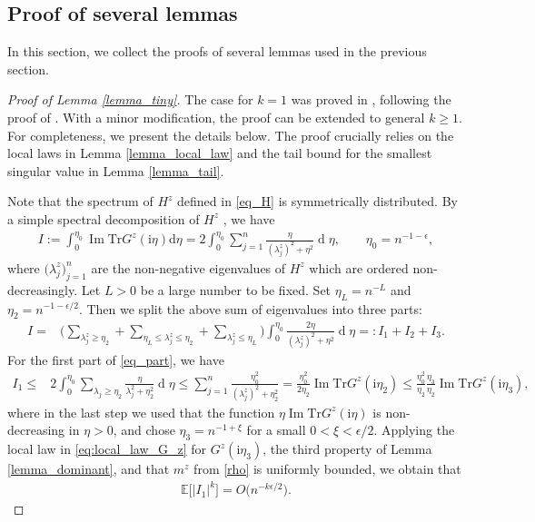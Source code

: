 \documentclass[10pt,reqno]{amsart}
\numberwithin{equation}{section}
\numberwithin{figure}{section}
\theoremstyle{plain}
\newcommand{\ii}{\mathrm{i}}
\newcommand{\<}{\langle}
\renewcommand{\>}{\rangle}
\newcommand{\dd}{\operatorname{d}\!{}}
\renewcommand{\Im}{\operatorname{Im}}
\begin{document}
\subsection{Proof of several lemmas}

In this section, we collect the proofs of several lemmas used in the previous section. 

\begin{proof}[Proof of Lemma \ref{lemma_tiny}]
	The case for $k=1$ was proved in \cite[Lemma 4.2]{chafai-garcia-zelada-xu}, following the proof of \cite[Lemma 4]{zbMATH07329432}. With a minor modification, the proof can be extended to general $k\geq 1$. For completeness, we present the details below. The proof crucially relies on the local laws in Lemma \ref{lemma_local_law} and the tail bound for the smallest singular value in Lemma \ref{lemma_tail}.  
	
	
	Note that the spectrum of $H^{z}$ defined in \eqref{eq_H} is symmetrically distributed. By a simple spectral decomposition of $H^{z}$ , we have
	\begin{align}
		I:=\int_{0}^{\eta_0}\Im \mathrm{Tr} G^z (\ii \eta) \mathrm{d} \eta=2  \int_{0}^{\eta_0} \sum_{j=1}^{n} \frac{\eta}{(\lambda_j^z)^2+\eta^2} \dd \eta, \qquad \eta_0=n^{-1-\epsilon},
	\end{align}
	where $\big(\lambda^{z}_{j}\big)_{j=1}^n$ are the non-negative eigenvalues of $H^z$ which are ordered non-decreasingly.
	Let $L>0$ be a large number to be fixed.  Set $\eta_L=n^{-L}$ and $\eta_2=n^{-1-\epsilon/2}$. Then we split the above sum of eigenvalues into three parts:
	\begin{align}\label{eq_part}
		I=& \Big(\sum_{\lambda^z_j \geq \eta_2}+\sum_{\eta_L\leq \lambda^z_j \leq \eta_2} +\sum_{\lambda^z_j\leq \eta_L}\Big)  \int_{0}^{\eta_0}  \frac{2\eta}{(\lambda_j^z)^2+\eta^2} \dd \eta=:I_1+I_2+I_3.
	\end{align}
	For the first part of \eqref{eq_part}, we have
	\begin{align}
		I_1\leq & 2 \int_{0}^{\eta_0} \sum_{\lambda_j\geq \eta_2} \frac{\eta}{\lambda_j^2+\eta_2^2} \dd \eta \leq   \sum_{j=1}^{n} \frac{\eta_0^2}{(\lambda^z_j)^2+\eta_2^2}   = \frac{\eta_0^2}{2\eta_2} \Im\mathrm{Tr}G^{z}(\ii \eta_2)\leq \frac{\eta_0^2}{\eta_2} \frac{\eta_3}{\eta_2} \Im\mathrm{Tr}G^{z}(\ii \eta_3),
	\end{align}
	where in the last step we used that the function $\eta\Im\mathrm{Tr}G^{z}(\ii \eta)$ is non-decreasing in $\eta>0$, and chose 
	$\eta_3=n^{-1+\xi}$ for a small $0<\xi<\epsilon/2$.  Applying the local law in \eqref{eq:local_law_G_z} for $G^{z}(\ii \eta_3)$, the third property of Lemma \ref{lemma_dominant}, and that $m^z$ from \eqref{rho} is uniformly bounded, we obtain that 
	\begin{align}\label{eq_first}
		\mathbb{E} \big[|I_1|^k\big]=O\big( n^{-k\epsilon/2}\big).
	\end{align}	
	

\end{proof}
\end{document}
